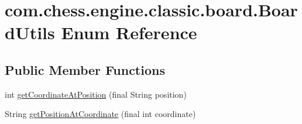 \hypertarget{enumcom_1_1chess_1_1engine_1_1classic_1_1board_1_1_board_utils}{}\section{com.\+chess.\+engine.\+classic.\+board.\+Board\+Utils Enum Reference}
\label{enumcom_1_1chess_1_1engine_1_1classic_1_1board_1_1_board_utils}
\subsection*{Public Member Functions}
\begin{DoxyCompactItemize}
\item 
int \mbox{\hyperlink{enumcom_1_1chess_1_1engine_1_1classic_1_1board_1_1_board_utils_acf917640c591cfc0cec01d15908ae6bf}{get\+Coordinate\+At\+Position}} (final String position)
\item 
String \mbox{\hyperlink{enumcom_1_1chess_1_1engine_1_1classic_1_1board_1_1_board_utils_a90f133b3561f0b4209e9cea03582b6e8}{get\+Position\+At\+Coordinate}} (final int coordinate)
\end{DoxyCompactItemize}
